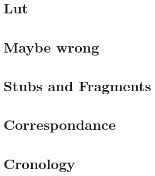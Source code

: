 \documentclass[12pt,leqno]{book}
\begin{document}
\part{Lut}



\part{Maybe wrong}


\part{Stubs and Fragments}





\part{Correspondance}














\part{Cronology}





\end{document}
